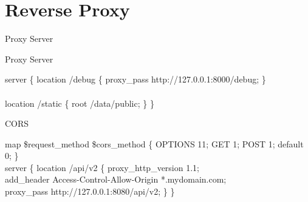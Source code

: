 \documentclass{beamer}
\begin{document}
\section{Reverse Proxy\cite{dejonghe2017nginx}}
\begin{frame}{Proxy Server}

	\begin{block}{Proxy Server}
	\vspace{0.01\textheight}
	\scriptsize
	\begin{Alms*}
		server \{ \NI
			location /debug \{ \NI
				proxy\_pass http://127.0.0.1:8000/debug;
			\ND \}
			\\
			\\
			location /static \{ \NI
				root /data/public;
			\ND \}
		\ND \}
		\\
		
	\end{Alms*}
\end{block}

\begin{block}{CORS}
	\vspace{0.01\textheight}
	\scriptsize
	\begin{Alms*}
		
		map \$request\_method \$cors\_method \{ \NI
			OPTIONS 11;
			GET 1;
			POST 1;
			default 0;
		\ND \}
		\\
		server \{ \NI
		location /api/v2 \{ \NI
		proxy\_http\_version 1.1; \\
		add\_header Access-Control-Allow-Origin *.mydomain.com; \\
		proxy\_pass http://127.0.0.1:8080/api/v2; 
		\ND \} 
		\ND \}
		\\
		
	\end{Alms*}
\end{block}

\end{frame}
\end{document}
